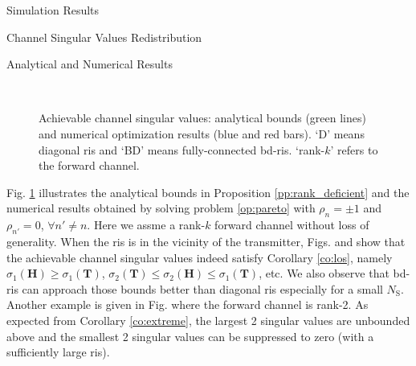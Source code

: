 \documentclass[journal]{IEEEtran}
\begin{document}
\begin{section}{Simulation Results}
\begin{subsection}{Channel Singular Values Redistribution}
		\begin{subsubsection}{Analytical and Numerical Results}
			\begin{figure}[!t]
				\centering
				\\
				\caption{
					Achievable channel singular values: analytical bounds (green lines) and numerical optimization results (blue and red bars).
					`D' means diagonal \gls{ris} and `BD' means fully-connected \gls{bd}-\gls{ris}.
					`rank-$k$' refers to the forward channel.
				}
				\label{fg:singular_bound}
			\end{figure}
			Fig. \ref{fg:singular_bound} illustrates the analytical bounds in Proposition \ref{pp:rank_deficient} and the numerical results obtained by solving problem \eqref{op:pareto} with $\rho_n = \pm 1$ and $\rho_{n'} = 0$, $\forall n' \ne n$.
			Here we assme a rank-$k$ forward channel without loss of generality.
			When the \gls{ris} is in the vicinity of the transmitter, Figs.  and  show that the achievable channel singular values indeed satisfy Corollary \ref{co:los}, namely $\sigma_1(\mathbf{H}) \ge \sigma_1(\mathbf{T})$, $\sigma_2(\mathbf{T}) \le \sigma_2(\mathbf{H}) \le \sigma_1(\mathbf{T})$, etc.
			We also observe that \gls{bd}-\gls{ris} can approach those bounds better than diagonal \gls{ris} especially for a small $N_\mathrm{S}$.
			Another example is given in Fig.  where the forward channel is rank-2.
			As expected from Corollary \ref{co:extreme}, the largest 2 singular values are unbounded above and the smallest 2 singular values can be suppressed to zero (with a sufficiently large \gls{ris}).

\end{subsubsection}
\end{subsection}
\end{section}
\end{document}
